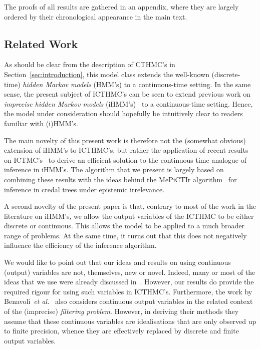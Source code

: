 \documentclass[3p]{elsarticle}
\begin{document}
The proofs of all results are gathered in an appendix, where they are largely ordered by their chronological appearance in the main text.

\subsection{Related Work}\label{sec:related}

As should be clear from the description of CTHMC's in Section~\ref{sec:introduction}, this model class extends the well-known (discrete-time) \emph{hidden Markov models} (HMM's) to a continuous-time setting. In the same sense, the present subject of ICTHMC's can be seen to extend previous work on \emph{imprecise hidden Markov models} (iHMM's)~\citep{deCooman:2010gd} to a continuous-time setting. Hence, the model  under consideration should hopefully be intuitively clear to readers familiar with (i)HMM's. 

The main novelty of this present work is therefore not the (somewhat obvious) extension of iHMM's to ICTHMC's, but rather the application of recent results on ICTMC's~\citep{krak2016ictmc} to derive an efficient solution to the continuous-time analogue of inference in iHMM's. The algorithm that we present is largely based on combining these results with the ideas behind the MePiCTIr algorithm~\citep{deCooman:2010gd} for inference in credal trees under epistemic irrelevance.

A second novelty of the present paper is that, contrary to most of the work in the literature on iHMM's, we allow the output variables of the ICTHMC to be either discrete or continuous. This allows the model to be applied to a much broader range of problems. At the same time, it turns out that this does not negatively influence the efficiency of the inference algorithm.

We would like to point out that our ideas and results on using continuous (output) variables are not, themselves, new or novel. Indeed, many or most of the ideas that we use were already discussed in~\cite[Section 6.10]{Walley:1991vk}. However, our results do provide the required rigour for using such variables in ICTHMC's. Furthermore, the work by Benavoli~\emph{et al.}~\cite{benavoli2011} also considers continuous output variables in the related context of the (imprecise) \emph{filtering problem}. However, in deriving their methods they assume that these continuous variables are idealisations that are only observed up to finite precision, whence they are effectively replaced by discrete and finite output variables.
\end{document}
